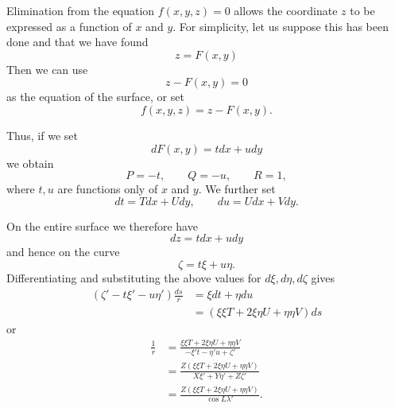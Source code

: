 \par{}%
\noindent\hspace*{1.2em}Elimination from the equation $f(x,y,z)=0$ allows the coordinate $z$ to be expressed as a function of $x$ and $y$. For simplicity, let us suppose this has been done and that we have found
\[
z=F(x,y)
\]
Then we can use
\[
z-F(x,y)=0
\]
as the equation of the surface, or set
\[
f(x,y,z)=z-F(x,y).
\]

Thus, if we set
\[
dF(x,y)=tdx+udy
\]
we obtain
\[
P=-t,\qquad Q=-u,\qquad R=1,
\]
where $t,u$ are functions only of $x$ and $y$. We further set
\[
dt=Tdx+Udy,\qquad du=Udx+Vdy.
\]

On the entire surface we therefore have
\[
dz=tdx+udy
\]
and hence on the curve
\[
\zeta=t\xi+u\eta.
\]
Differentiating and substituting the above values for $d\xi,d\eta,d\zeta$ gives
\[
\begin{aligned}
(\zeta'-t\xi'-u\eta')\frac{ds}{r}&=\xi dt+\eta du\\
&=(\xi\xi T+2\xi\eta U+\eta\eta V)ds
\end{aligned}
\]
or
\[
\begin{aligned}
\frac1r&=\frac{\xi\xi T+2\xi\eta U+\eta\eta V}{-\xi't-\eta'u+\zeta'}\\
&=\frac{Z(\xi\xi T+2\xi\eta U+\eta\eta V)}{X\xi'+Y\eta'+Z\zeta'}\\
&=\frac{Z(\xi\xi T+2\xi\eta U+\eta\eta V)}{\cos L\lambda'}.
\end{aligned}
\]
